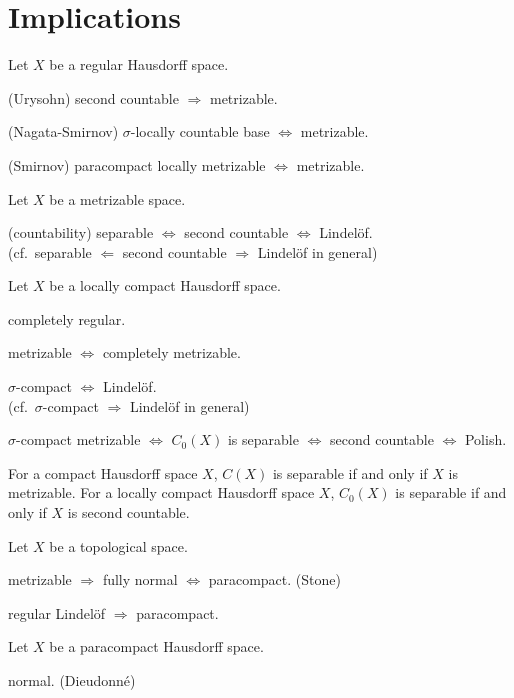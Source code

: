 \documentclass{../../large}
\begin{document}
\newpage
\section*{Implications}

\begin{prb}
Let $X$ be a regular Hausdorff space.
\begin{parts}
\item (Urysohn) second countable $\Rightarrow$ metrizable.
\item (Nagata-Smirnov) $\sigma$-locally countable base $\Leftrightarrow$ metrizable.
\item (Smirnov) paracompact locally metrizable $\Leftrightarrow$ metrizable.
\end{parts}
\end{prb}


\begin{prb}
Let $X$ be a metrizable space.
\begin{parts}
\item (countability) separable $\Leftrightarrow$ second countable $\Leftrightarrow$ Lindel\"of.\\
(cf.~separable $\Leftarrow$ second countable $\Rightarrow$ Lindel\"of in general)
\end{parts}
\end{prb}


\begin{prb}
Let $X$ be a locally compact Hausdorff space.
\begin{parts}
\item completely regular.
\item metrizable $\Leftrightarrow$ completely metrizable.
\item $\sigma$-compact $\Leftrightarrow$ Lindel\"of.\\
(cf.~$\sigma$-compact $\Rightarrow$ Lindel\"of in general)
\item $\sigma$-compact metrizable $\Leftrightarrow$ $C_0(X)$ is separable $\Leftrightarrow$ second countable $\Leftrightarrow$ Polish.
\end{parts}
\end{prb}

For a compact Hausdorff space $X$, $C(X)$ is separable if and only if $X$ is metrizable.
For a locally compact Hausdorff space $X$, $C_0(X)$ is separable if and only if $X$ is second countable.


\begin{prb}
Let $X$ be a topological space.
\begin{parts}
\item metrizable $\Rightarrow$ fully normal $\Leftrightarrow$ paracompact. (Stone)
\item regular Lindel\"of $\Rightarrow$ paracompact.
\end{parts}
\end{prb}

\begin{prb}
Let $X$ be a paracompact Hausdorff space.
\begin{parts}
\item normal. (Dieudonn\'e)
\item
\end{parts}
\end{prb}
\end{document}
